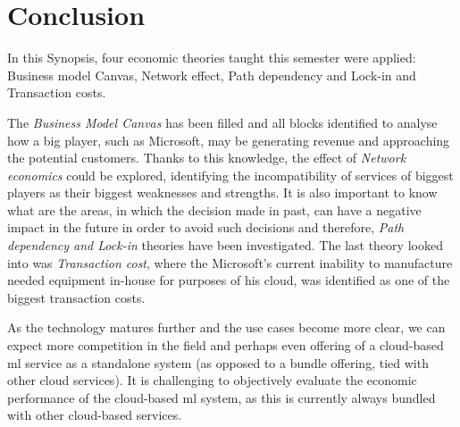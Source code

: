 \section{Conclusion}\label{sec:conclusion}

In this Synopsis, four economic theories taught this semester were applied: Business model Canvas, Network effect, Path dependency and Lock-in and Transaction costs.

The \textit{Business Model Canvas} has been filled and all blocks identified to analyse how a big player, such as Microsoft, may be generating revenue and approaching the potential customers. Thanks to this knowledge, the effect of \textit{Network economics} could be explored, identifying the incompatibility of services of biggest players as their biggest weaknesses and strengths. It is also important to know what are the areas, in which the decision made in past, can have a negative impact in the future in order to avoid such decisions and therefore, \textit{Path dependency and Lock-in} theories have been investigated. The last theory looked into was \textit{Transaction cost}, where the Microsoft's current inability to manufacture needed equipment in-house for purposes of his cloud, was identified as one of the biggest transaction costs.

As the technology matures further and the use cases become more clear, we can expect more competition in the field and perhaps even offering of a cloud-based \acrshort{ml} service as a standalone system (as opposed to a bundle offering, tied with other cloud services). It is challenging to objectively evaluate the economic performance of the cloud-based \acrshort{ml} system, as this is currently always bundled with other cloud-based services.